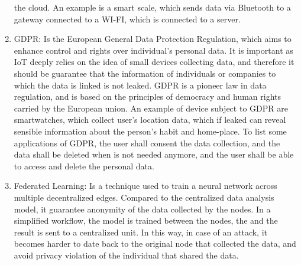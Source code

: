 \documentclass[acmsmall, screen,timestamp,nonacm]{acmart}
\begin{document}
\begin{enumerate}
		 the cloud. An example is a smart scale, which sends data via Bluetooth to a gateway
		 connected to a WI-FI, which is connected to a server.
	\item GDPR: Is the European General Data Protection Regulation, which aims to
		enhance control and rights over individual's personal data. It is
		important as IoT deeply relies on the idea of small devices collecting
		data, and therefore it should be guarantee that 
		the information of individuals or companies to which the data is linked
		is not leaked. GDPR is a pioneer law in data regulation, and is based on
		the principles of democracy and human rights carried by the European
		union.
		An example of device subject to GDPR are smartwatches, which collect user's location data,
		which if leaked can reveal sensible information about the person's
		habit and home-place. To list some applications of GDPR, the user shall consent the data
		collection, and the data shall be deleted when is not needed anymore, and
		the user shall be able to access and delete the personal data.
	\item Federated Learning: Is a technique used to train a neural network across multiple
		decentralized edges. Compared to the centralized data analysis model, it
		guarantee anonymity of the data collected by the nodes. In a simplified
		workflow, the model is trained between the nodes, the and the result is
		sent to a centralized unit. In this way, in case of an attack, it
		becomes harder to date back to the original node that collected the
		data, and avoid privacy violation of the individual that shared the data.  
\end{enumerate}

\end{document}
